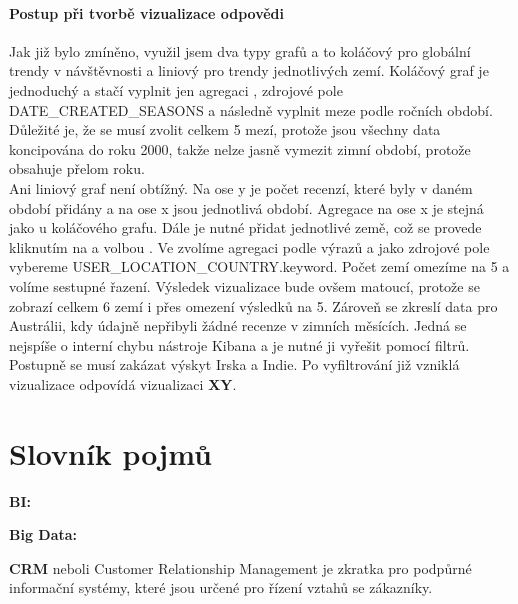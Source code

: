 \documentclass[czech,BP]{thesiskiv}
\begin{document}
\subsubsection{Postup při tvorbě vizualizace odpovědi}
Jak již bylo zmíněno, využil jsem dva typy grafů a to koláčový pro globální trendy v návštěvnosti a liniový pro trendy jednotlivých zemí. Koláčový graf je jednoduchý a stačí vyplnit jen agregaci , zdrojové pole DATE\_CREATED\_SEASONS a následně vyplnit meze podle ročních období. Důležité je, že se musí zvolit celkem 5 mezí, protože jsou všechny data koncipována do roku 2000, takže nelze jasně vymezit zimní období, protože obsahuje přelom roku.
\\
Ani liniový graf není obtížný. Na ose y je počet recenzí, které byly v daném období přidány a na ose x jsou jednotlivá období. Agregace na ose x je stejná jako u koláčového grafu. Dále je nutné přidat jednotlivé země, což se provede kliknutím na  a volbou . Ve  zvolíme agregaci podle výrazů a jako zdrojové pole vybereme USER\_LOCATION\_COUNTRY.keyword. Počet zemí omezíme na 5 a volíme sestupné řazení. Výsledek vizualizace bude ovšem matoucí, protože se zobrazí celkem 6 zemí i přes omezení výsledků na 5. Zároveň se zkreslí data pro Austrálii, kdy údajně nepřibyli žádné recenze v zimních měsících. Jedná se nejspíše o interní chybu nástroje Kibana a je nutné ji vyřešit pomocí filtrů. Postupně se musí zakázat výskyt Irska a Indie. Po vyfiltrování již vzniklá vizualizace odpovídá vizualizaci\textbf{ XY}.

% 

%
\chapter{Slovník pojmů}



\hspace{0,5cm} \textbf{BI:}  \cite{BI}

\textbf{Big Data:}  \cite{BigData}

\textbf{CRM} neboli Customer Relationship Management je zkratka pro podpůrné informační systémy, které jsou určené pro řízení vztahů se zákazníky.
\end{document}
